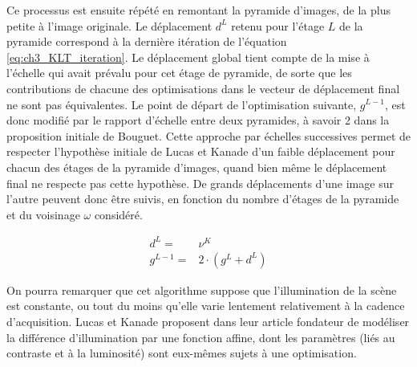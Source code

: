 Ce processus est ensuite répété en \og remontant\fg{} la pyramide d'images, de la plus petite à l'image originale. Le déplacement $d^L$ retenu pour l'étage $L$ de la pyramide correspond à la dernière itération de l'équation \ref{eq:ch3_KLT_iteration}. Le déplacement global tient compte de la mise à l'échelle qui avait prévalu pour cet étage de pyramide, de sorte que les contributions de chacune des optimisations dans le vecteur de déplacement final ne sont pas équivalentes. Le point de départ de l'optimisation suivante, $g^{L-1}$, est donc modifié par le rapport d'échelle entre deux pyramides, à savoir 2 dans la proposition initiale de Bouguet. Cette approche par échelles successives permet de respecter l'hypothèse initiale de Lucas et Kanade d'un faible déplacement pour chacun des étages de la pyramide d'images, quand bien même le déplacement final ne respecte pas cette hypothèse. De grands déplacements d'une image sur l'autre peuvent donc être suivis, en fonction du nombre d'étages de la pyramide et du voisinage $\omega$ considéré.

\begin{align} \label{eq:ch3_KLT_pyramid}
	d^L =& \nu^K \\
	g^{L-1} =& 2 \cdot (g^L + d^L)
\end{align}

On pourra remarquer que cet algorithme suppose que l'illumination de la scène est constante, ou tout du moins qu'elle varie lentement relativement à la cadence d'acquisition. Lucas et Kanade proposent dans leur article fondateur de modéliser la différence d'illumination par une fonction affine, dont les paramètres (liés au contraste et à la luminosité) sont eux-mêmes sujets à une optimisation.